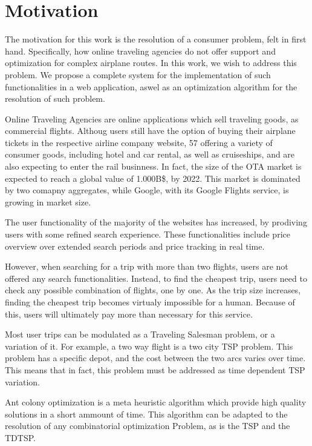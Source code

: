 \section{Motivation}

The motivation for this work is the resolution of a consumer problem,
felt in first hand. Specifically, how online traveling agencies do not offer
support and optimization for complex airplane routes. In this work, we wish
to address this problem. We propose a complete system for the implementation
of such functionalities in a web application,
aswel as an optimization algorithm for the resolution of such problem.

Online Traveling Agencies are online applications which sell traveling goods,
as commercial flights. Althoug users still have the option of buying
their airplane tickets in the respective airline company website,
57%
offering a variety of consumer goods, including hotel and car rental,
as well as cruiseships, and are also expecting to enter the rail businness.
In fact, the size of the OTA market is expected to reach a global value of 1.000B\$,
by 2022.  This market is dominated by two comapny aggregates,
while Google, with its Google Flights service, is growing in market size.

The user functionality of the majority of the websites has increased,
by prodiving users with some refined search experience. These functionalities
include price overview over extended search periods
and price tracking in real time.

However, when searching for a trip
with more than two flights, users are not offered any search functionalities.
Instead, to find the cheapest trip, users need to check any
possible combination of flights, one by one. As the trip size increases, finding
the cheapest trip becomes virtualy impossible for a human. Because of this,
users will ultimately pay more than necessary for this service.

Most user trips can be modulated as a Traveling Salesman problem, or a variation
of it. For example, a two way flight is a two city TSP problem. This problem has
a specific depot, and the cost between the two arcs varies over time. This means
that in fact, this problem must be addressed as time dependent TSP variation.

Ant colony optimization is a meta heuristic algorithm which provide
high quality solutions in a short ammount of time. This algorithm
can be adapted to the resolution of any combinatorial optimization Problem,
as is the TSP and the TDTSP.

